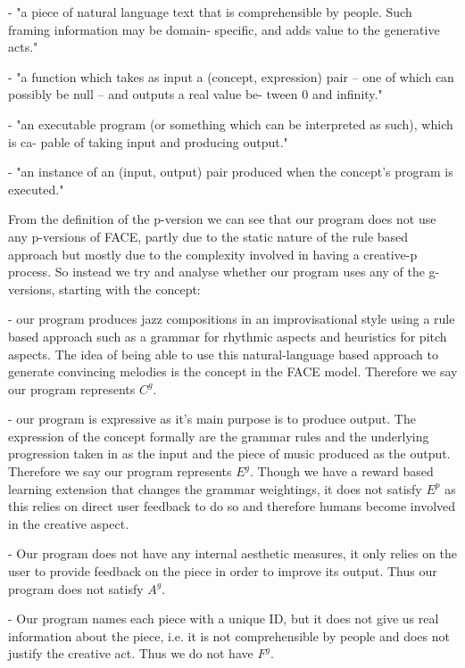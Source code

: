 \documentclass[pdftex,12pt,a4paper]{report}
\begin{document}
\begin{description} \itemsep1pt \parskip0pt  
  \item[Framing Information ] - "a piece of natural language text that is comprehensible by people. Such framing information may be domain- specific, and adds value to the generative acts."
  \item[Aesthetic Measure] - "a function which takes as input a (concept, expression) pair – one of which can possibly be null – and outputs a real value be- tween 0 and infinity."
  \item[Concept] - "an executable program (or something which can be interpreted as such), which is ca- pable of taking input and producing output."
  \item[Expression of a Concept] - "an instance of an (input, output) pair produced when the concept’s program is executed."
\end{description}

From the definition of the p-version we can see that our program does not use any p-versions of FACE, partly due to the static nature of the rule based approach but mostly due to the complexity involved in having a creative-p process. So instead we try and analyse whether our program uses any of the g-versions, starting with the concept:

\begin{description}  \itemsep1pt \parskip0pt  
  \item[Concept-g] - our program produces jazz compositions in an improvisational style using a rule based approach such as a grammar for rhythmic aspects and heuristics for pitch aspects. The idea of being able to use this natural-language based approach to generate convincing melodies is the concept in the FACE model. Therefore we say our program represents $C^{g}$.
  \item[Expression-g] - our program is expressive as it's main purpose is to produce output. The expression of the concept formally are the grammar rules and the underlying progression taken in as the input and the piece of music produced as the output. Therefore we say our program represents $E^{g}$. Though we have a reward based learning extension that changes the grammar weightings, it does not satisfy $E^{p}$ as this relies on direct user feedback to do so and therefore humans become involved in the creative aspect.
  \item[Aesthetics-g] - Our program does not have any internal aesthetic measures, it only relies on the user to provide feedback on the piece in order to improve its output. Thus our program does not satisfy $A^{g}$.
  \item[Framing-g] - Our program names each piece with a unique ID, but it does not give us real information about the piece, i.e. it is not comprehensible by people and does not justify the creative act. Thus we do not have $F^{g}$.
\end{description}
\end{document}
